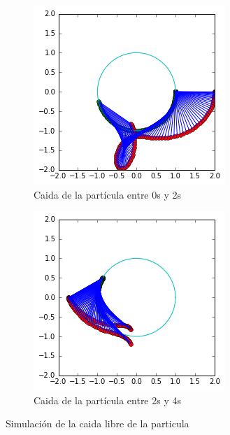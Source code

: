 \documentclass[10pt]{article}
\begin{document}
\begin{figure}[h]
 \centering
 \begin{subfigure}{0.4\textwidth}
  \includegraphics[width=\textwidth]{../fig/fig.png}
  \caption{Caida de la partícula entre 0s y 2s}
 \end{subfigure}
 \begin{subfigure}{0.4\textwidth}
  \includegraphics[width=\textwidth]{../fig/fig2.png}
  \caption{Caida de la partícula entre 2s y 4s}
 \end{subfigure}
\caption{Simulación de la caida libre de la particula}

\end{figure}
\end{document}
